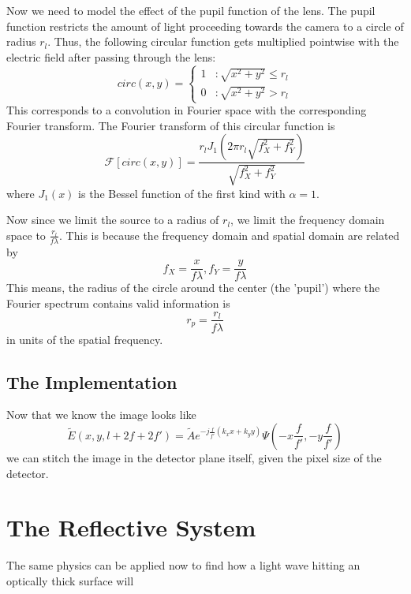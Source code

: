 \documentclass[11pt,a4paper,journal]{IEEEtran}
\begin{document}
Now we need to model the effect of the pupil function of the lens. The pupil function restricts the amount of light proceeding towards the camera to a circle of radius $r_{l}$. Thus, the following circular function gets multiplied pointwise with the electric field after passing through the lens:
\begin{equation}
circ(x, y) = \left\{
  \begin{array}{lr}
    1 & : \sqrt{x^2 + y^2} \le r_{l} \\
    0 & : \sqrt{x^2 + y^2} > r_{l}
  \end{array}
\right.
\end{equation}
This corresponds to a convolution in Fourier space with the corresponding Fourier transform. The Fourier transform of this circular function is
\begin{equation}
\mathcal{F}[circ(x, y)] = \frac{r_{l} J_1(2\pi r_l \sqrt{f_X ^2 + f_Y ^2})}{\sqrt{f_X ^2 + f_Y ^2}}
\end{equation}
where $J_1(x)$ is the Bessel function of the first kind with $\alpha=1$.

Now since we limit the source to a radius of $r_l$, we limit the frequency domain space to $\frac{r_l}{f\lambda}$. This is because the frequency domain and spatial domain are related by
\begin{equation*}
f_X=\frac{x}{f\lambda}, f_Y=\frac{y}{f\lambda}
\end{equation*}
This means, the radius of the circle around the center (the 'pupil') where the Fourier spectrum contains valid information is
\begin{equation}
r_p = \frac{r_l}{f\lambda}
\end{equation}
in units of the spatial frequency.

\subsection{The Implementation}
Now that we know the image looks like 
\begin{equation*}
\tilde{E}(x, y, l+2f+2f') = \tilde{A} e^{-j\frac{f}{f'}\left(k_x x + k_y y\right)} \Psi\left(-x\frac{f}{f'}, -y\frac{f}{f'}\right)
\end{equation*}
we can stitch the image in the detector plane itself, given the pixel size of the detector.

\section{The Reflective System}
The same physics can be applied now to find how a light wave hitting an optically thick surface will 
\end{document}
